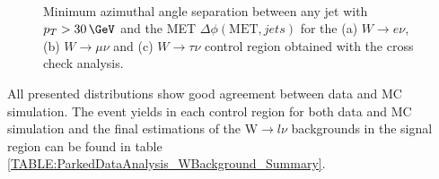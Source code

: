 \begin{figure}[!htb]
\centering
{}
 \\
\caption[Minimum azimuthal angle separation between any jet with $p_{T}>30\,\GeV$ and the MET $\Delta\phi(\text{MET},jets)$ for the $W\rightarrow e\nu$, $W\rightarrow\mu\nu$ and $W\rightarrow\tau\nu$ control region obtained with the cross check analysis.]
{Minimum azimuthal angle separation between any jet with $p_{T}>30\,\GeV$ and the \gls{MET} $\Delta\phi(\text{MET},jets)$ for the (a) $W\rightarrow e\nu$, (b) $W\rightarrow\mu\nu$ and (c) $W\rightarrow\tau\nu$ control region obtained with the cross check analysis.}
\label{FIGURE:ParkedDataAnalysis_WBackground_MinDeltaPhi}
\end{figure}

All presented distributions show good agreement between data and \gls{MC} simulation. The event yields in each control region for both data and \gls{MC} simulation and the final estimations of the W$\rightarrow l\nu$ backgrounds in the signal region can be found in table \ref{TABLE:ParkedDataAnalysis_WBackground_Summary}.
 
